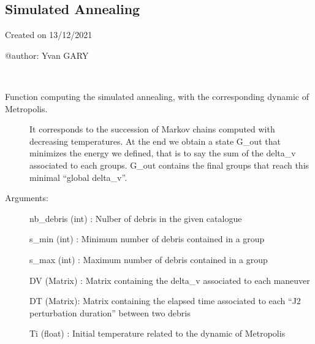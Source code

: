 \documentclass[letterpaper,10pt,english]{sphinxmanual}
\begin{document}
\subsection{Simulated Annealing}
\label{\detokenize{regroupement/optimizer:simulated-annealing}}\label{\detokenize{regroupement/optimizer:module-regroupement.optimizer.Recuit}}
Created on 13/12/2021

@author: Yvan GARY

\begin{fulllineitems}
\label{\detokenize{regroupement/optimizer:regroupement.optimizer.Recuit.Recuit}}~\begin{description}
\item[{Function computing the simulated annealing, with the corresponding dynamic of Metropolis.}] \leavevmode
It corresponds to the succession of Markov chains computed with decreasing temperatures. At the end
we obtain a state G\_out that minimizes the energy we defined, that is to say the sum of the delta\_v
associated to each groups. G\_out contains the final groups that reach this minimal “global delta\_v”.

\item[{Arguments:}] \leavevmode
nb\_debris (int) : Nulber of debris in the given catalogue

s\_min (int) : Minimum number of debris contained in a group

s\_max (int) : Maximum number of debris contained in a group

DV (Matrix) : Matrix containing the delta\_v associated to each maneuver

DT (Matrix): Matrix containing the elapsed time associated to each “J2 perturbation duration” between two debris

Ti (float) : Initial temperature related to the dynamic of Metropolis


\end{description}
\end{fulllineitems}
\end{document}
